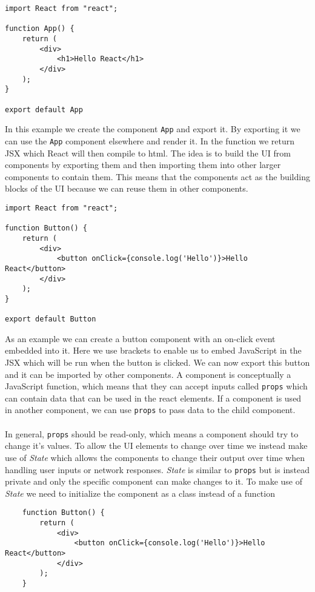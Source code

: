 \begin{lstlisting}
import React from "react";
    
function App() {
    return (
        <div>
            <h1>Hello React</h1>
        </div>
    );
}

export default App
\end{lstlisting}
In this example we create the component \texttt{App} and export it. By exporting it we can use the \texttt{App} component elsewhere and render it. 
In the function we return JSX which React will then compile to html.
The idea is to build the UI from components by exporting them and then importing them into other larger components to contain them. This means that the components act as the building blocks of the UI because we can reuse them in other components.
\begin{lstlisting}
import React from "react";
        
function Button() {
    return (
        <div>
            <button onClick={console.log('Hello')}>Hello React</button>
        </div>
    );
}
    
export default Button
\end{lstlisting}
As an example we can create a button component with an on-click event embedded into it. 
Here we use brackets to enable us to embed JavaScript in the JSX which will be run when the button is clicked.
We can now export this button and it can be imported by other components. 
A component is conceptually a JavaScript function, which means that they can accept inputs called \texttt{props} which can contain data that can be used in the react elements. If a component is used in another component, we can use \texttt{props} to pass data to the child component.
\\\\
In general, \texttt{props} should be read-only, which means a component should try to change it's values. 
To allow the UI elements to change over time we instead make use of \textit{State} which allows the components to change their output over time when handling user inputs or network responses. 
\textit{State}  is similar to \texttt{props} but is instead private and only the specific component can make changes to it. To make use of \textit{State} we need to initialize the component as a class instead of a function
\begin{lstlisting}
    function Button() {
        return (
            <div>
                <button onClick={console.log('Hello')}>Hello React</button>
            </div>
        );
    }
\end{lstlisting}
